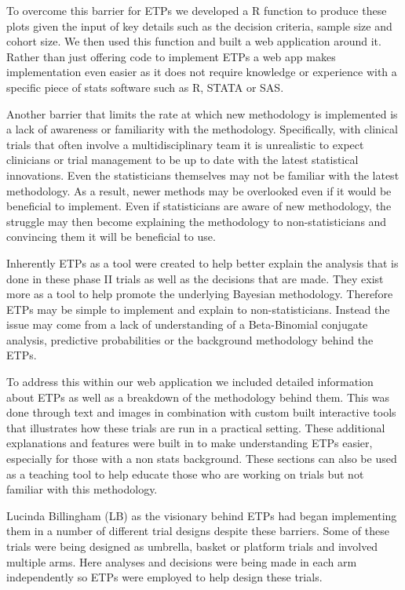 To overcome this barrier for ETPs we developed a R function to produce these plots given the input of key details such as the decision criteria, sample size and cohort size. We then used this function and built a web application around it. Rather than just offering code to implement ETPs a web app makes implementation even easier as it does not require knowledge or experience with a specific piece of stats software such as R, STATA or SAS. 

Another barrier that limits the rate at which new methodology is implemented is a lack of awareness or familiarity with the methodology. Specifically, with clinical trials that often involve a multidisciplinary team it is unrealistic to expect clinicians or trial management to be up to date with the latest statistical innovations. Even the statisticians themselves may not be familiar with the latest methodology. As a result, newer methods may be overlooked even if it would be beneficial to implement. Even if statisticians are aware of new methodology, the struggle may then become explaining the methodology to non-statisticians and convincing them it will be beneficial to use. 

Inherently ETPs as a tool were created to help better explain the analysis that is done in these phase \RN{2} trials as well as the decisions that are made. They exist more as a tool to help promote the underlying Bayesian methodology. Therefore ETPs may be simple to implement and explain to non-statisticians. Instead the issue may come from a lack of understanding of a Beta-Binomial conjugate analysis, predictive probabilities or the background methodology behind the ETPs. 

To address this within our web application we included detailed information about ETPs as well as a breakdown of the methodology behind them. This was done through text and images in combination with custom built interactive tools that illustrates how these trials are run in a practical setting. These additional explanations and features were built in to make understanding ETPs easier, especially for those with a non stats background. These sections can also be used as a teaching tool to help educate those who are working on trials but not familiar with this methodology.  

Lucinda Billingham (LB) as the visionary behind ETPs had began implementing them in a number of different trial designs despite these barriers. Some of these trials were being designed as umbrella, basket or platform trials and involved multiple arms. Here analyses and decisions were being made in each arm independently so ETPs were employed to help design these trials. 

